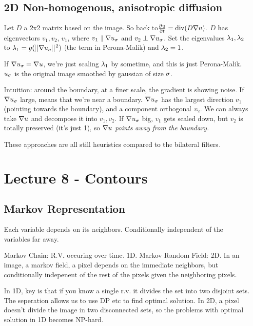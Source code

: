 \subsection{2D Non-homogenous, anisotropic diffusion}
\label{sec:2d-non-homogenous}
Let $D$ a 2x2 matrix based on the image. So back to$\frac{\partial
  u}{\partial t} = \text{div}(D\nabla u) $. $D$ has eigenvectors $v_1,
v_2$, $v_1$, where  $v_1 \parallel \nabla u_\sigma$ and $v_2 \perp \nabla
u_\sigma$. Set the eigenvalues $\lambda_1, \lambda_2$ to $\lambda_1 = g(||\nabla u_\sigma
||^2)$ (the term in Perona-Malik) and $\lambda_2 = 1$.

If $\nabla u_\sigma = \nabla u$, we're just scaling $\lambda_1$ by sometime,
and this is just Perona-Malik. $u_\sigma$ is the original image smoothed
by gaussian of size $\sigma$.

Intuition: around the boundary, at a finer scale, the gradient is
showing noise. If $\nabla u_\sigma$ large, means that we're near a
boundary. 
$\nabla u_\sigma$ has the largest direction $v_1$ (pointing towards the boundary), and a component
orthogonal $v_2$. We can always take $\nabla u$ and decompose it
into $v_1, v_2$. If $\nabla u_\sigma$ big, $v_1$ gets scaled down, but
$v_2$ is totally preserved (it's just 1), so \emph{$\nabla u$ points away
from the boundary.} 

These approaches are all still heuristics compared to the bilateral
filters.

\pagebreak

\section{Lecture 8 - Contours}
\label{sec:lecture-8-contours}

\subsection{Markov Representation}
\label{sec:mark-repr}

Each variable depends on its neighbors. Conditionally independent of
the variables far away.

Markov Chain: R.V. occuring over time. 1D.
Markov Random Field: 2D. In an image, a markov field, a
pixel depends on the immediate neighbors, but conditionally indepenent of
the rest of the pixels given the neighboring pixels.

In 1D, key is that if you know a single r.v. it divides the set into
two disjoint sets. The seperation allows us to use DP etc to find
optimal solution. In 2D, a pixel doesn't divide the image in two
disconnected sets, so the problems with optimal solution in 1D becomes
NP-hard.

